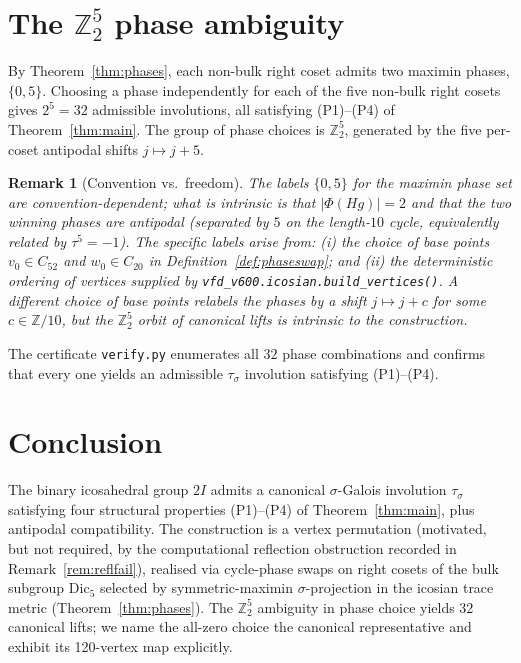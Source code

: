 \documentclass[11pt]{article}
\newtheorem{remark}{Remark}[section]
\newcommand{\twoI}{2I}
\newcommand{\Dicfive}{\mathrm{Dic}_5}
\newcommand{\sigmaG}{\sigma}
\newcommand{\tausigma}{\tau_{\!\sigmaG}}
\begin{document}
\section{The $\mathbb{Z}_2^5$ phase ambiguity}\label{sec:Z25}

By Theorem~\ref{thm:phases}, each non-bulk right coset admits two
maximin phases, $\{0, 5\}$. Choosing a phase independently for each
of the five non-bulk right cosets gives $2^5 = 32$ admissible
involutions, all satisfying (P1)–(P4) of Theorem~\ref{thm:main}. The
group of phase choices is $\mathbb{Z}_2^5$, generated by the five
per-coset antipodal shifts $j \mapsto j + 5$.

\begin{remark}[Convention vs.~freedom]\label{rem:conv}
The labels $\{0, 5\}$ for the maximin phase set are
\emph{convention-dependent}; what is intrinsic is that
$|\Phi(Hg)| = 2$ and that the two winning phases are antipodal
(separated by $5$ on the length-$10$ cycle, equivalently related by
$\tau^5 = -1$). The specific labels arise from:
(i) the choice of base points $v_0 \in C_{52}$ and $w_0 \in C_{20}$ in
Definition~\ref{def:phaseswap}; and
(ii) the deterministic ordering of vertices supplied by
\texttt{vfd\_v600.icosian.build\_vertices()}. A different choice of
base points relabels the phases by a shift $j \mapsto j + c$ for some
$c \in \mathbb{Z}/10$, but the $\mathbb{Z}_2^5$ orbit of canonical
lifts is intrinsic to the construction.
\end{remark}

The certificate \texttt{verify.py} enumerates all $32$ phase
combinations and confirms that every one yields an admissible
$\tausigma$ involution satisfying (P1)–(P4).

\section{Conclusion}\label{sec:concl}

The binary icosahedral group $\twoI$ admits a canonical $\sigmaG$-Galois
involution $\tausigma$ satisfying four structural properties (P1)–(P4)
of Theorem~\ref{thm:main}, plus antipodal compatibility. The
construction is a vertex permutation (motivated, but not required, by
the computational reflection obstruction recorded in
Remark~\ref{rem:reflfail}), realised via cycle-phase swaps on right
cosets of the bulk subgroup $\Dicfive$ selected by symmetric-maximin
$\sigmaG$-projection in the icosian trace metric
(Theorem~\ref{thm:phases}). The $\mathbb{Z}_2^5$
ambiguity in phase choice yields $32$ canonical lifts; we name the
all-zero choice the canonical representative and exhibit its
120-vertex map explicitly.
\end{document}
